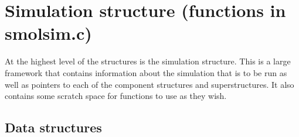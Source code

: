 \documentclass {scrbook}
\begin{document}
\section{Simulation structure (functions in smolsim.c)}

At the highest level of the structures is the simulation structure. This is a large framework that contains information about the simulation that is to be run as well as pointers to each of the component structures and superstructures. It also contains some scratch space for functions to use as they wish.

\subsection{Data structures}
\end{document}
